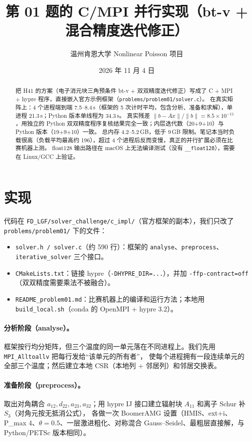 \documentclass[11pt,a4paper]{ctexart}
\title{第 01 题的 C/MPI 并行实现（bt-v + 混合精度迭代修正）}
\author{温州肯恩大学 \quad Nonlinear Poisson 项目}
\date{2026 年 11 月 4 日}
\begin{document}
\maketitle

\begin{abstract}
把 H41 的方案（电子消元块三角预条件 bt-v + 双双精度迭代修正）写成了 C + MPI + hypre 程序，直接嵌入官方示例框架（\texttt{problems/problem01/solver.c}）。
在真实矩阵上：4 个进程端到端 7.5--8.4\,s（框架的 5 次计时平均，包含分析、准备和求解），单进程 21.3\,s；Python 版本单线程为 34.3\,s。
真实残差 $\|b-Ax\|/\|b\|=8.5\times10^{-11}$，用独立的 Python 双双精度程序复核结果完全一致；内层迭代数（20+9+10）与 Python 版本（19+9+10）一致。
总内存 4.2--5.2\,GB，低于 9\,GB 限制。笔记本当时负载很高（负载平均最高约 196），超过 4 个进程后反而变慢，真正的并行扩展必须在比赛机器上测。
float128 输出路径在 macOS 上无法编译测试（没有 \texttt{\_\_float128}），需要在 Linux/GCC 上验证。
\end{abstract}

\section{实现}
代码在 \texttt{FD\_LGF/\allowbreak solver\_challenge/\allowbreak c\_impl/}（官方框架的副本），我们只改了 \texttt{problems/problem01/} 下的文件：
\begin{itemize}
\item \texttt{solver.h / solver.c}（约 590 行）：框架的 \texttt{analyse}、\texttt{preprocess}、\texttt{iterative\_solver} 三个接口。
\item \texttt{CMakeLists.txt}：链接 hypre（\texttt{-DHYPRE\_DIR=...}），并加 \texttt{-ffp-contract=off}（双双精度需要乘法不被融合）。
\item \texttt{README\_problem01.md}：比赛机器上的编译和运行方法；本地用 \texttt{build\_local.sh}（conda 的 OpenMPI + hypre 3.2）。
\end{itemize}
\paragraph{分析阶段（analyse）。}框架按行均分矩阵，但三个温度的同一单元落在不同进程上。我们先用 \texttt{MPI\_Alltoallv} 把每行发给“该单元的所有者”，
使每个进程拥有一段连续单元的全部三个温度；然后建立本地 CSR（本地列 + 邻居列）和邻居交换表。
\paragraph{准备阶段（preprocess）。}取出对角耦合 $a_{12},d_{22},a_{23},a_{32}$；用 hypre IJ 接口建立辐射块 $A_{11}$ 和离子 Schur 补 $S_3$（对角元按无抵消公式），
各做一次 BoomerAMG 设置（HMIS、ext+i、P\_max 4、$\theta=0.5$、一层激进粗化、对称混合 Gauss--Seidel、最粗层直接解，与 Python/PETSc 版本相同）。
\end{document}
